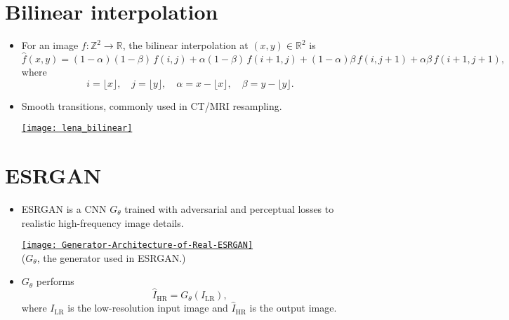 \section{Bilinear interpolation}

\begin{itemize}
\item For an image $f: \mathbb{Z}^2 \to \mathbb{R}$, the bilinear interpolation at 
$(x,y) \in \mathbb{R}^2$ is
\begin{equation}
\hat{f}(x,y) = (1-\alpha)(1-\beta)\, f(i,j) 
+ \alpha(1-\beta)\, f(i+1,j) 
+ (1-\alpha)\beta\, f(i,j+1) 
+ \alpha\beta\, f(i+1,j+1),
\end{equation}
where
\[
i = \lfloor x \rfloor, \quad j = \lfloor y \rfloor, \quad
\alpha = x - \lfloor x \rfloor, \quad \beta = y - \lfloor y \rfloor.
\]
  \newpage
\item Smooth transitions, commonly used in \gls{CT}/\gls{MRI} resampling.
\begin{center}
  \href{https://github.com/vicente-gonzalez-ruiz/medical_imaging/blob/main/notebooks/bilinear_interpolation.ipynb}{\texttt{[image: lena\_bilinear]}}
\end{center}
\end{itemize}

\section{\gls{ESRGAN}}
\begin{itemize}
\item ESRGAN is a  \gls{CNN}
  $G_\theta$ trained with adversarial and perceptual losses to
   realistic high-frequency image
  details.
  \vspace{-2ex}
  \begin{center}
    \href{https://arxiv.org/abs/2207.08036}{\texttt{[image: Generator-Architecture-of-Real-ESRGAN]}}\\
    \vspace{-1ex}
    ($G_\theta$, the generator used in \gls{ESRGAN}.)
  \end{center}

\item $G_\theta$ performs
  \begin{equation}
    \hat{I}_{\text{HR}} = G_\theta(I_{\text{LR}}),
  \end{equation}
  where $I_{\text{LR}}$ is the low-resolution input image and
  $\hat{I}_{\text{HR}}$ is the  output image.
\end{itemize}

